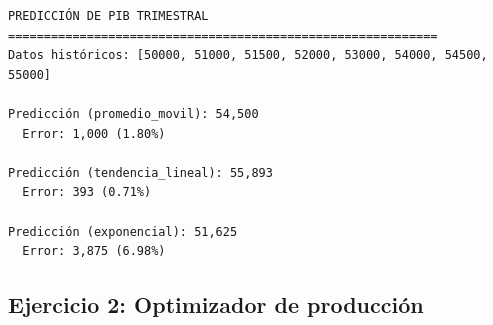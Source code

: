 \documentclass[
  doc,
  floatsintext,
  longtable,
  a4paper,
  nolmodern,
  notxfonts,
  notimes,
  12pt,
  colorlinks=true,linkcolor=blue,citecolor=blue,urlcolor=blue]{apa7}
\begin{document}
\begin{verbatim}
PREDICCIÓN DE PIB TRIMESTRAL
============================================================
Datos históricos: [50000, 51000, 51500, 52000, 53000, 54000, 54500, 55000]

Predicción (promedio_movil): 54,500
  Error: 1,000 (1.80%)

Predicción (tendencia_lineal): 55,893
  Error: 393 (0.71%)

Predicción (exponencial): 51,625
  Error: 3,875 (6.98%)
\end{verbatim}

\subsection{Ejercicio 2: Optimizador de
producción}\label{ejercicio-2-optimizador-de-producciuxf3n}
\end{document}
